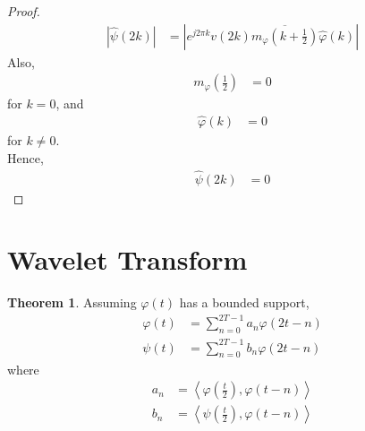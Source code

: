 \documentclass[titlepage, fleqn, a4paper, 12pt, twoside]{article}
\theoremstyle{definition}
\theoremstyle{theorem}
\newtheorem{theorem}{Theorem}
\begin{document}
\begin{proof}
	\begin{align*}
		\left| \hat{\psi}(2 k) \right| &= \left| e^{j 2 \pi k} v(2 k) \overline{m_{\varphi}\left( k + \frac{1}{2} \right)} \hat{\varphi}(k) \right|
	\end{align*}
	Also,
	\begin{align*}
		m_{\varphi}\left( \frac{1}{2} \right) &= 0
	\end{align*}
	for $k = 0$, and
	\begin{align*}
		\hat{\varphi}(k) &= 0
	\end{align*}
	for $k \neq 0$.\\
	Hence,
	\begin{align*}
		\hat{\psi}(2 k) &= 0
	\end{align*}
\end{proof}

\section{Wavelet Transform}

\begin{theorem}
	Assuming $\varphi(t)$ has a bounded support,
	\begin{align*}
		\varphi(t) &= \sum\limits_{n = 0}^{2 T - 1} a_n \varphi(2 t - n)\\
		\psi(t) &= \sum\limits_{n = 0}^{2 T - 1} b_n \varphi(2 t - n)
	\end{align*}
	where
	\begin{align*}
		a_n &= \left\langle \varphi\left( \frac{t}{2} \right) , \varphi(t - n) \right\rangle\\
		b_n &= \left\langle \psi\left( \frac{t}{2} \right) , \varphi(t - n) \right\rangle
	\end{align*}
\end{theorem}
\end{document}
